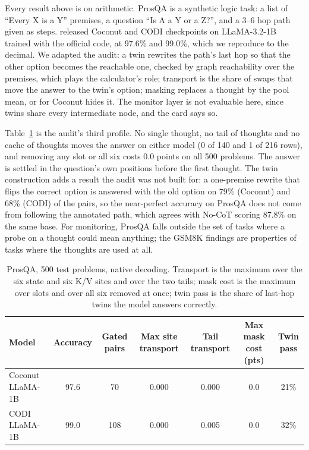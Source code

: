 \documentclass{article}
\begin{document}
Every result above is on arithmetic. ProsQA \citep{hao2024coconut} is a synthetic logic task: a list of ``Every X is a Y'' premises, a question ``Is A a Y or a Z?'', and a 3--6 hop path given as steps. \citet{dilgren2026interpretable} released Coconut and CODI checkpoints on LLaMA-3.2-1B trained with the official code, at 97.6\% and 99.0\%, which we reproduce to the decimal. We adapted the audit: a twin rewrites the path's last hop so that the other option becomes the reachable one, checked by graph reachability over the premises, which plays the calculator's role; transport is the share of swaps that move the answer to the twin's option; masking replaces a thought by the pool mean, or for Coconut hides it. The monitor layer is not evaluable here, since twins share every intermediate node, and the card says so.

Table~\ref{tab:prosqa} is the audit's third profile. No single thought, no tail of thoughts and no cache of thoughts moves the answer on either model (0 of 140 and 1 of 216 rows), and removing any slot or all six costs 0.0 points on all 500 problems. The answer is settled in the question's own positions before the first thought. The twin construction adds a result the audit was not built for: a one-premise rewrite that flips the correct option is answered with the old option on 79\% (Coconut) and 68\% (CODI) of the pairs, so the near-perfect accuracy on ProsQA does not come from following the annotated path, which agrees with No-CoT scoring 87.8\% on the same base. For monitoring, ProsQA falls outside the set of tasks where a probe on a thought could mean anything; the GSM8K findings are properties of tasks where the thoughts are used at all.

\begin{table}[h]
\caption{ProsQA, 500 test problems, native decoding. Transport is the maximum over the six state and six K/V sites and over the two tails; mask cost is the maximum over slots and over all six removed at once; twin pass is the share of last-hop twins the model answers correctly.}
\label{tab:prosqa}
\centering
\scriptsize
\setlength{\tabcolsep}{3pt}
\begin{tabular}{lcccccc}
\toprule
Model & Accuracy & Gated pairs & Max site transport & Tail transport & Max mask cost (pts) & Twin pass \\
\midrule
Coconut LLaMA-1B & 97.6 & 70 & 0.000 & 0.000 & 0.0 & 21\% \\
CODI LLaMA-1B & 99.0 & 108 & 0.000 & 0.005 & 0.0 & 32\% \\
\bottomrule
\end{tabular}
\end{table}
\end{document}
